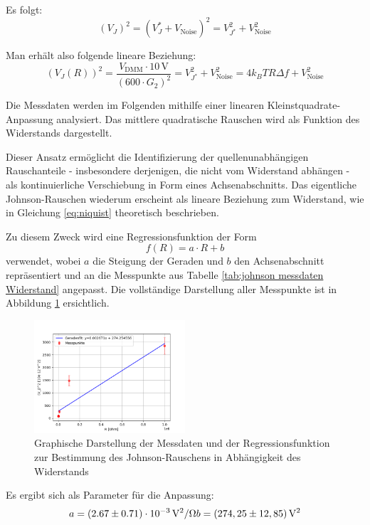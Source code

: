 Es folgt: 
\begin{equation}
(V_J)^2 = (V_J^* + V_{\text{Noise}})^2 = V_{J^*}^2 + V_{\text{Noise}}^2 
\end{equation}

Man erhält also folgende lineare Beziehung:
\begin{equation}
        (V_J(R))^2 = \frac{V_{\mathrm{DMM}} \cdot 10\,\mathrm{V}}{(600 \cdot G_2)^2} = V_{J^*}^2 + V_{\text{Noise}}^2 = 4k_B T R \Delta f + V_{\text{Noise}}^2
\end{equation}

Die Messdaten werden im Folgenden mithilfe einer linearen Kleinstquadrate-Anpassung analysiert. Das mittlere quadratische Rauschen wird als Funktion des Widerstands dargestellt.

Dieser Ansatz ermöglicht die Identifizierung der quellenunabhängigen Rauschanteile - insbesondere derjenigen, die nicht vom Widerstand abhängen - als kontinuierliche Verschiebung in Form eines Achsenabschnitts. Das eigentliche Johnson-Rauschen wiederum erscheint als lineare Beziehung zum Widerstand, wie in Gleichung \ref{eq:niquist} theoretisch beschrieben.

Zu diesem Zweck wird eine Regressionsfunktion der Form
\begin{equation}
f(R) = a \cdot R + b
\end{equation}
verwendet, wobei $a$ die Steigung der Geraden und $b$ den Achsenabschnitt repräsentiert und an die Messpunkte aus Tabelle \ref{tab:johnson messdaten Widerstand} angepasst. Die vollständige Darstellung aller Messpunkte ist in Abbildung \ref{fig:fit1} ersichtlich.
\begin{figure}[htbp]
    \centering
    \includegraphics[width=0.5\textwidth]{figs/johnson_resistance.png}
    \caption{Graphische Darstellung der Messdaten und der Regressionsfunktion zur Bestimmung des Johnson-Rauschens in Abhängigkeit des Widerstands}
    \label{fig:fit1}
\end{figure}
\FloatBarrier

Es ergibt sich als Parameter für die Anpassung:
\begin{equation}
a = (2.67 \pm 0.71) \cdot 10^{-3} \, \mathrm{V}^2/\Omega\\
b = (274,25 \pm 12,85) \, \mathrm{V}^2
\end{equation}

